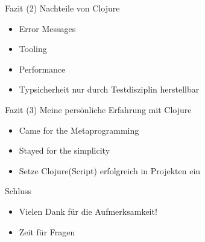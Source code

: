 \documentclass[presentation]{beamer}
\begin{document}
\begin{frame}{Fazit (2)}
  Nachteile von Clojure
  \begin{itemize}
  \item Error Messages
  \item Tooling
  \item Performance
  \item Typsicherheit nur durch Testdisziplin herstellbar
  \end{itemize}
\end{frame}

\begin{frame}{Fazit (3)}
  Meine persönliche Erfahrung mit Clojure
  \begin{itemize}
  \item Came for the Metaprogramming
  \item Stayed for the simplicity
  \item Setze Clojure(Script) erfolgreich in Projekten ein
  \end{itemize}
\end{frame}

\begin{frame}{Schluss}
  \begin{itemize}
  \item Vielen Dank für die Aufmerksamkeit!
  \item Zeit für Fragen
  \end{itemize}
\end{frame}
\end{document}
